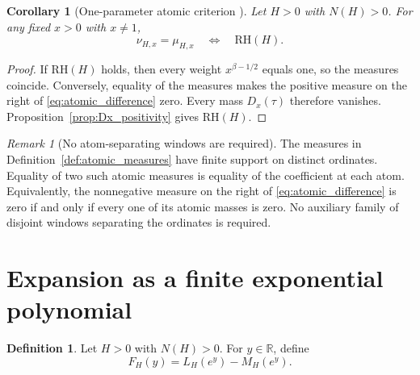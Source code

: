 \documentclass[11pt]{amsart}
\numberwithin{equation}{section}
\theoremstyle{plain}
\newtheorem{corollary}[theorem]{Corollary}
\theoremstyle{definition}
\newtheorem{definition}[theorem]{Definition}
\theoremstyle{remark}
\newtheorem{remark}[theorem]{Remark}
\newcommand{\RH}{\mathrm{RH}}
\begin{document}
\begin{corollary}[One-parameter atomic criterion {}]
\label{cor:atomic_criterion}
Let $H>0$ with $N(H)>0$.
For any fixed $x>0$ with $x\neq1$,
\begin{equation}
\boxed{
\nu_{H,x}=\mu_{H,x}
\quad\Longleftrightarrow\quad
\RH(H).
}
\label{eq:atomic_criterion}
\end{equation}
\end{corollary}

\begin{proof}
If $\RH(H)$ holds, then every weight $x^{\beta-1/2}$ equals one, so the measures coincide.  Conversely, equality of the measures makes the positive measure on the right of \eqref{eq:atomic_difference} zero.  Every mass $D_x(\tau)$ therefore vanishes.  Proposition~\ref{prop:Dx_positivity} gives $\RH(H)$.
\end{proof}

\begin{remark}[No atom-separating windows are required]
\label{rem:no_atom_separating_windows}
The measures in Definition~\ref{def:atomic_measures} have finite support on distinct ordinates.  Equality of two such atomic measures is equality of the coefficient at each atom.  Equivalently, the nonnegative measure on the right of \eqref{eq:atomic_difference} is zero if and only if every one of its atomic masses is zero.  No auxiliary family of disjoint windows separating the ordinates is required.
\end{remark}

\section{Expansion as a finite exponential polynomial}
\label{sec:exponential_polynomial}

\begin{definition}
\label{def:FH}
Let $H>0$ with $N(H)>0$.  For $y\in\mathbb R$, define
\begin{equation}
F_H(y)
=
L_H(e^y)-M_H(e^y).
\label{eq:FH_definition}
\end{equation}
\end{definition}
\end{document}
